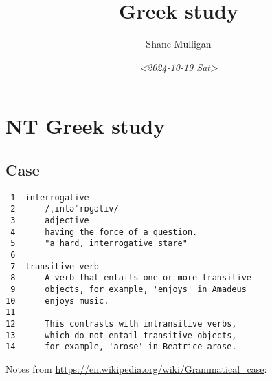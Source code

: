 \documentclass[11pt]{article}
\author{Shane Mulligan}
\date{\textit{<2024-10-19 Sat>}}
\title{Greek study}
\begin{document}
\maketitle

\section{NT Greek study}
\label{sec:org9b0acc9}
\subsection{Case}
\label{sec:org5f359e9}

\begin{verbatim}
 1  interrogative
 2      /ˌɪntəˈrɒɡətɪv/
 3      adjective
 4      having the force of a question.
 5      "a hard, interrogative stare"
 6  
 7  transitive verb
 8      A verb that entails one or more transitive
 9      objects, for example, 'enjoys' in Amadeus
10      enjoys music.
11  
12      This contrasts with intransitive verbs,
13      which do not entail transitive objects,
14      for example, 'arose' in Beatrice arose.
\end{verbatim}

Notes from \url{https://en.wikipedia.org/wiki/Grammatical\_case}:
\end{document}
